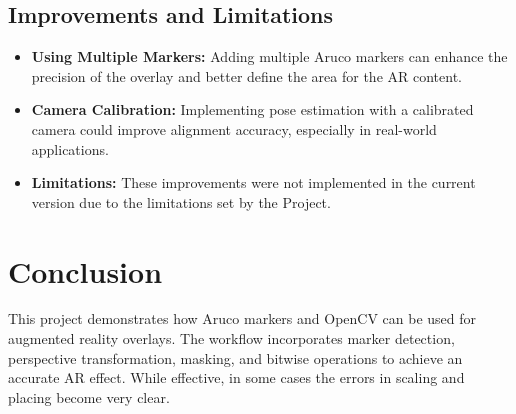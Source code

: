 \documentclass{article}
\begin{document}
\subsection*{Improvements and Limitations}
\begin{itemize}
    \item \textbf{Using Multiple Markers:} Adding multiple Aruco markers can enhance the precision of the overlay and better define the area for the AR content.
    \item \textbf{Camera Calibration:} Implementing pose estimation with a calibrated camera could improve alignment accuracy, especially in real-world applications.
    \item \textbf{Limitations:} These improvements were not implemented in the current version due to the limitations set by the Project.
\end{itemize}

\section*{Conclusion}
This project demonstrates how Aruco markers and OpenCV can be used for augmented reality overlays. The workflow incorporates marker detection, perspective transformation, masking, and bitwise operations to achieve an accurate AR effect. While effective, in some cases the errors in scaling and placing become very clear.
\end{document}

